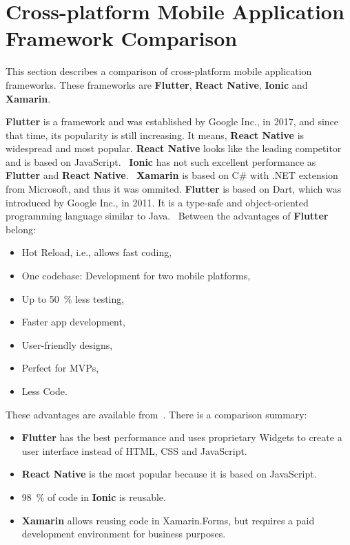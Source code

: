 \section{Cross-platform Mobile Application Framework Comparison}\label{sec:cross-platform-mobile-application-framework-comparison}
This section describes a comparison of cross-platform mobile application frameworks.
These frameworks are \textbf{Flutter}, \textbf{React Native}, \textbf{Ionic} and \textbf{Xamarin}.

\textbf{Flutter} is a framework and was established by Google Inc., in 2017, and since that time, its popularity is still increasing.
It means, \textbf{React Native} is widespread and most popular.
\textbf{React Native} looks like the leading competitor and is based on JavaScript.~\cite{flutterVsReactNativeNevercodeIo}
\textbf{Ionic} has not such excellent performance as \textbf{Flutter} and \textbf{React Native}.~\cite{crossPlatformFrameworokComparation}
\textbf{Xamarin} is based on C\# with .NET extension from Microsoft, and thus it was ommited.
\textbf{Flutter} is based on Dart, which was introduced by Google Inc., in 2011.
It is a type-safe and object-oriented programming language similar to Java.~\cite{dartTypeSystem}
Between the advantages of \textbf{Flutter} belong:
\begin{itemize}
    \item Hot Reload, i.e., allows fast coding,
    \item One codebase: Development for two mobile platforms,
    \item Up to 50~\% less testing,
    \item Faster app development,
    \item User-friendly designs,
    \item Perfect for MVPs,
    \item Less Code.
\end{itemize}
These advantages are available from~\cite{flutterVsReactNativeHackrIo}.
\newline
\newline
There is a comparison summary:
\begin{itemize}
    \item \textbf{Flutter} has the best performance and uses proprietary Widgets to create a user interface instead of HTML, CSS and JavaScript.
    \item \textbf{React Native} is the most popular because it is based on JavaScript.
    \item 98~\% of code in \textbf{Ionic} is reusable.
    \item \textbf{Xamarin} allows reusing code in Xamarin.Forms, but requires a paid development environment for business purposes.
\end{itemize}